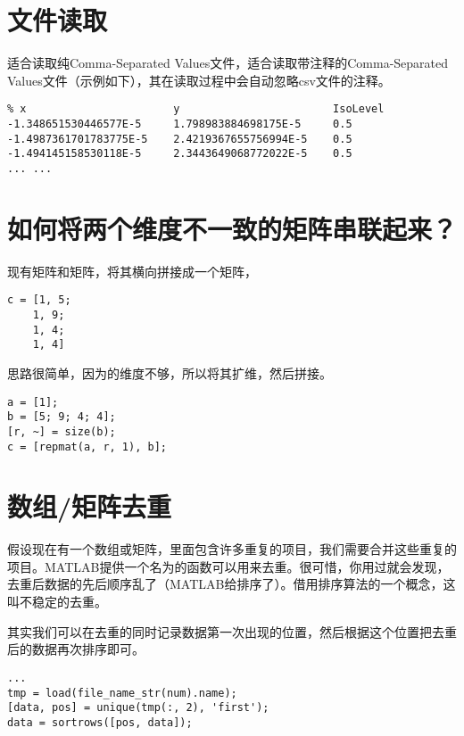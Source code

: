 \section{文件读取}

适合读取纯Comma-Separated Values文件，适合读取带注释的Comma-Separated Values文件（示例如下），其在读取过程中会自动忽略csv文件的注释。

\begin{verbatim}
% x                       y                        IsoLevel
-1.348651530446577E-5     1.798983884698175E-5     0.5
-1.4987361701783775E-5    2.4219367655756994E-5    0.5
-1.494145158530118E-5     2.3443649068772022E-5    0.5
... ...
\end{verbatim}

\section{如何将两个维度不一致的矩阵串联起来？}

现有矩阵和矩阵，将其横向拼接成一个矩阵，

\begin{verbatim}
c = [1, 5;
    1, 9;
    1, 4;
    1, 4]
\end{verbatim}

思路很简单，因为的维度不够，所以将其扩维，然后拼接。

\begin{verbatim}
a = [1];
b = [5; 9; 4; 4];
[r, ~] = size(b);
c = [repmat(a, r, 1), b];
\end{verbatim}

\section{数组/矩阵去重}

假设现在有一个数组或矩阵，里面包含许多重复的项目，我们需要合并这些重复的项目。MATLAB提供一个名为的函数可以用来去重。很可惜，你用过就会发现，去重后数据的先后顺序乱了（MATLAB给排序了）。借用排序算法的一个概念，这叫不稳定的去重。

其实我们可以在去重的同时记录数据第一次出现的位置，然后根据这个位置把去重后的数据再次排序即可。

\begin{verbatim}
...
tmp = load(file_name_str(num).name);
[data, pos] = unique(tmp(:, 2), 'first');
data = sortrows([pos, data]);
\end{verbatim}


